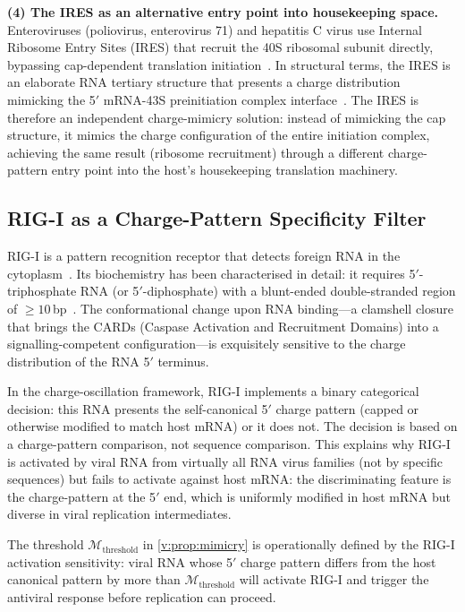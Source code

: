 \textbf{(4) The IRES as an alternative entry point into housekeeping space.}
Enteroviruses (poliovirus, enterovirus 71) and hepatitis C virus use Internal Ribosome Entry Sites (IRES) that recruit the 40S ribosomal subunit directly, bypassing cap-dependent translation initiation~\cite{Pelletier1988,Tsukiyama1992}. In structural terms, the IRES is an elaborate RNA tertiary structure that presents a charge distribution mimicking the 5$'$ mRNA-43S preinitiation complex interface~\cite{Yamamoto2020,Niepmann2009}. The IRES is therefore an independent charge-mimicry solution: instead of mimicking the cap structure, it mimics the charge configuration of the entire initiation complex, achieving the same result (ribosome recruitment) through a different charge-pattern entry point into the host's housekeeping translation machinery.

\subsection{RIG-I as a Charge-Pattern Specificity Filter}

RIG-I is a pattern recognition receptor that detects foreign RNA in the cytoplasm~\cite{Yoneyama2004}. Its biochemistry has been characterised in detail: it requires 5$'$-triphosphate RNA (or 5$'$-diphosphate) with a blunt-ended double-stranded region of $\geq 10$\,bp~\cite{Goubau2014,Devarkar2016}. The conformational change upon RNA binding---a clamshell closure that brings the CARDs (Caspase Activation and Recruitment Domains) into a signalling-competent configuration---is exquisitely sensitive to the charge distribution of the RNA 5$'$ terminus.

In the charge-oscillation framework, RIG-I implements a binary categorical decision: this RNA presents the self-canonical 5$'$ charge pattern (capped or otherwise modified to match host mRNA) or it does not. The decision is based on a charge-pattern comparison, not sequence comparison. This explains why RIG-I is activated by viral RNA from virtually all RNA virus families (not by specific sequences) but fails to activate against host mRNA: the discriminating feature is the charge-pattern at the 5$'$ end, which is uniformly modified in host mRNA but diverse in viral replication intermediates.

The threshold $\mathcal{M}_{\mathrm{threshold}}$ in \cref{v:prop:mimicry} is operationally defined by the RIG-I activation sensitivity: viral RNA whose 5$'$ charge pattern differs from the host canonical pattern by more than $\mathcal{M}_{\mathrm{threshold}}$ will activate RIG-I and trigger the antiviral response before replication can proceed.

